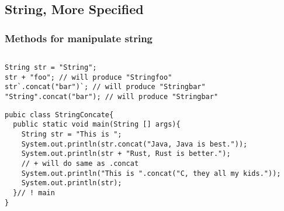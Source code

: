 \documentclass[
  11pt, %
  xcolor=dvipsnames
]{beamer}
\begin{document}
\subsection{String, More Specified}
\begin{frame}[fragile]
	\frametitle{Methods for manipulate string}


	\begin{columns}[c]
		\begin{column}{0.8\textwidth}

			\begin{lstlisting}[style=Java]
String str = "String";
str + "foo"; // will produce "Stringfoo"
str`.concat("bar")`; // will produce "Stringbar"
"String".concat("bar"); // will produce "Stringbar"
      \end{lstlisting}


			\begin{lstlisting}[style=Java]
pubic class StringConcate{
  public static void main(String [] args){
    String str = "This is ";
    System.out.println(str.concat("Java, Java is best."));
    System.out.println(str + "Rust, Rust is better.");
    // + will do same as .concat
    System.out.println("This is ".concat("C, they all my kids."));
    System.out.println(str);
  }// ! main
}
      \end{lstlisting}


		\end{column}
	\end{columns}

\end{frame}
\end{document}
